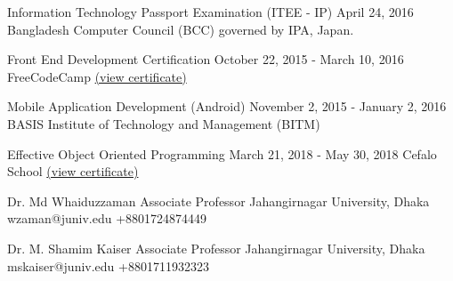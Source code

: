 \cvcertificate
{Information Technology Passport Examination (ITEE - IP)}
{April 24, 2016}
{Bangladesh Computer Council (BCC) governed by IPA, Japan.}
\divider

\cvcertificate
{Front End Development Certification}
{October 22, 2015 - March 10, 2016}
{FreeCodeCamp \href{https://www.freecodecamp.org/certification/arsho/legacy-front-end}{(view certificate)}}
\divider

\cvcertificate
{Mobile Application Development (Android)}
{November 2, 2015 - January 2, 2016}
{BASIS Institute of Technology and Management (BITM)}

\divider

\cvcertificate
{Effective Object Oriented Programming}
{March 21, 2018 - May 30, 2018}
{Cefalo School \href{https://school.cefalolab.com/20181104.pdf}{(view certificate)}}

\medskip


\cvref
{Dr. Md Whaiduzzaman}
{Associate Professor}
{Jahangirnagar University, Dhaka}
{wzaman@juniv.edu}
{+8801724874449}

\divider

\cvref
{Dr. M. Shamim Kaiser}
{Associate Professor}
{Jahangirnagar University, Dhaka}
{mskaiser@juniv.edu}
{+8801711932323}

